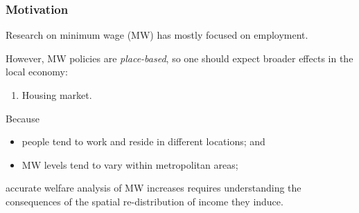 
\begin{frame}
	\frametitle{Motivation}
	
	Research on minimum wage (MW) has mostly focused on employment.
	
	\vspace{1.5mm}
	However, MW policies are \textit{place-based}, so one should expect broader effects 
	in the local economy:
	\begin{enumerate}[$\Rightarrow$]
		\item Housing market.
	\end{enumerate}

	\pause
	\vspace{3mm}
	Because
	\begin{itemize}
		\vspace{.5mm} \item people tend to work and reside in different locations; and 
		\vspace{.5mm} \item MW levels tend to vary within metropolitan areas;
	\end{itemize}
	\vspace{.5mm} 
	accurate welfare analysis of MW increases requires understanding the consequences of 
	the spatial re-distribution of income they induce.
	
\end{frame}

